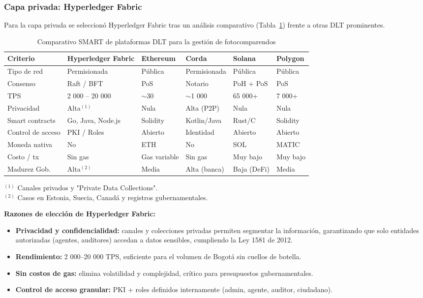 \subsubsection{Capa privada: Hyperledger Fabric}

Para la capa privada se seleccionó Hyperledger Fabric tras un análisis comparativo (Tabla~\ref{tab:dlt_smart}) frente a otras DLT prominentes.

\begin{table}[H]
\centering
\small
\caption{Comparativo SMART de plataformas DLT para la gestión de fotocomparendos}
\begin{tabular}{p{2.4cm}p{2.2cm}p{2cm}p{2cm}p{2cm}p{2cm}}
\toprule
\textbf{Criterio} & \textbf{Hyperledger Fabric} & \textbf{Ethereum} & \textbf{Corda} & \textbf{Solana} & \textbf{Polygon} \\
\midrule
Tipo de red & Permisionada & Pública & Permisionada & Pública & Pública \\
Consenso & Raft / BFT & PoS & Notario & PoH + PoS & PoS \\
TPS & 2 000 – 20 000 & $\sim$30 & $\sim$1 000 & 65 000+ & 7 000+ \\
Privacidad & Alta$^{(1)}$ & Nula & Alta (P2P) & Nula & Nula \\
Smart contracts & Go, Java, Node.js & Solidity & Kotlin/Java & Rust/C & Solidity \\
Control de acceso & PKI / Roles & Abierto & Identidad & Abierto & Abierto \\
Moneda nativa & No & ETH & No & SOL & MATIC \\
Costo / tx & Sin gas & Gas variable & Sin gas & Muy bajo & Muy bajo \\
Madurez Gob. & Alta$^{(2)}$ & Media & Alta (banca) & Baja (DeFi) & Media \\
\bottomrule
\end{tabular}
\vspace{2pt}
\footnotesize
$^{(1)}$ Canales privados y "Private Data Collections".\\
$^{(2)}$ Casos en Estonia, Suecia, Canadá y registros gubernamentales.
\label{tab:dlt_smart}
\end{table}

\textbf{Razones de elección de Hyperledger Fabric:}

\begin{itemize}
    \item \textbf{Privacidad y confidencialidad:} canales y colecciones privadas permiten segmentar la información, garantizando que solo entidades autorizadas (agentes, auditores) accedan a datos sensibles, cumpliendo la Ley 1581 de 2012.
    
    \item \textbf{Rendimiento:} 2 000–20 000 TPS, suficiente para el volumen de Bogotá sin cuellos de botella.
    
    \item \textbf{Sin costos de gas:} elimina volatilidad y complejidad, crítico para presupuestos gubernamentales.
    
    \item \textbf{Control de acceso granular:} PKI + roles definidos internamente (admin, agente, auditor, ciudadano).
\end{itemize}

